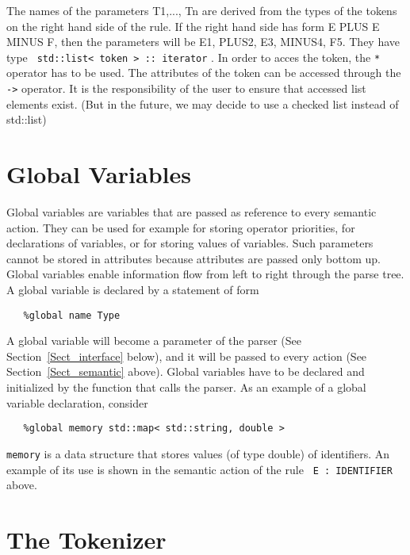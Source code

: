 \documentclass{article}
\begin{document}
\noindent
The names of the parameters T1,..., Tn are derived
from the types of the tokens on the right hand side of the rule.
If the right hand side has form E PLUS E MINUS F, then the
parameters will be E1, PLUS2, E3, MINUS4, F5.
They have type \verb+ std::list< token > :: iterator+ . In order to
acces the token, the \verb+*+ operator 
has to be used.
The attributes of the token
can be accessed through the \verb+->+ operator. It is the responsibility
of the user to ensure that accessed list elements exist.
(But in the future, we may decide to use a checked list instead of
std::list)

\section{Global Variables}
\label{Sect_global}

\noindent
Global variables are variables that are passed as reference 
to every semantic action. They can be used for example for 
storing operator priorities, for
declarations of variables, or for storing values of variables.
Such parameters cannot be stored in attributes because attributes
are passed only bottom up. Global variables enable information
flow from left to right through the parse tree.
A global variable is declared by a statement of form 

\begin{verbatim}
   %global name Type 
\end{verbatim}

\noindent
A global variable will become a parameter of the parser 
(See Section~\ref{Sect_interface} below), and it
will be passed to every action (See Section~\ref{Sect_semantic} above).
Global variables have to be declared and initialized by the 
function that calls the parser.
As an example of a global variable declaration, consider

\begin{verbatim}
   %global memory std::map< std::string, double >
\end{verbatim}

\noindent
\verb+memory+ is a data structure that stores values (of type double) 
of identifiers.
An example of its use is shown in the semantic
action of the rule \verb+ E : IDENTIFIER + above.

\section{The Tokenizer}
\label{Sect_tokenizer}
\end{document}
